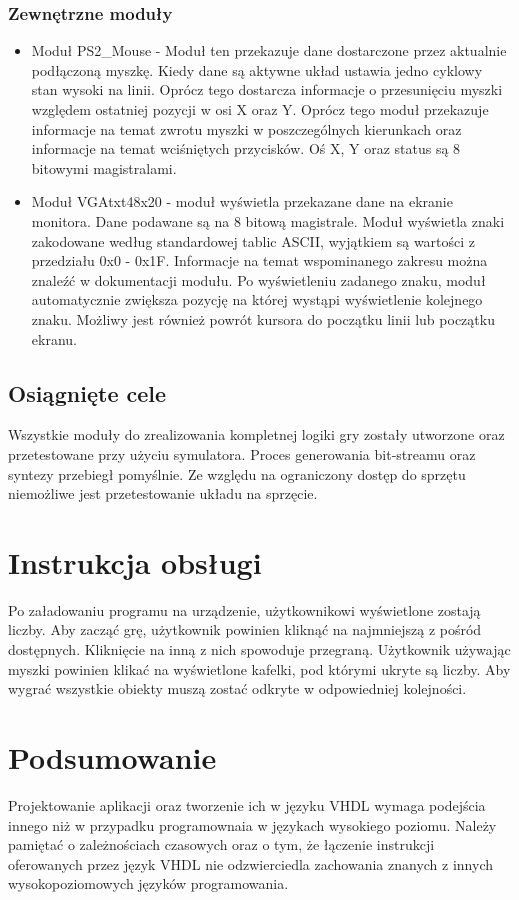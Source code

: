 \documentclass[polish,polish,a4paper]{article}
\begin{document}
\subsubsection{Zewnętrzne moduły}
\begin{itemize}
 \item Moduł PS2\_Mouse - Moduł ten przekazuje dane dostarczone przez aktualnie podłączoną myszkę. Kiedy dane są aktywne układ ustawia jedno cyklowy stan wysoki na linii. Oprócz tego dostarcza informacje o przesunięciu myszki względem ostatniej pozycji w osi X oraz Y. Oprócz tego moduł przekazuje informacje na temat zwrotu myszki w poszczególnych kierunkach oraz informacje na temat wciśniętych przycisków. Oś X, Y oraz status są 8 bitowymi magistralami.
 \item Moduł VGAtxt48x20 - moduł wyświetla przekazane dane na ekranie monitora. Dane podawane są na 8 bitową magistrale. Moduł wyświetla znaki zakodowane według standardowej tablic ASCII, wyjątkiem są wartości z przedziału 0x0 - 0x1F. Informacje na temat wspominanego zakresu można znaleźć w dokumentacji modułu. Po wyświetleniu zadanego znaku, moduł automatycznie zwiększa pozycję na której wystąpi wyświetlenie kolejnego znaku. Możliwy jest również powrót kursora do początku linii lub początku ekranu.
 \end{itemize}

\subsection{Osiągnięte cele}
Wszystkie moduły do zrealizowania kompletnej logiki gry zostały utworzone oraz przetestowane przy użyciu symulatora. Proces generowania bit-streamu oraz syntezy przebiegł pomyślnie. Ze względu na ograniczony dostęp do sprzętu niemożliwe jest przetestowanie układu na sprzęcie.
\section{Instrukcja obsługi}
Po załadowaniu programu na urządzenie, użytkownikowi wyświetlone zostają liczby. Aby zacząć grę, użytkownik powinien kliknąć na najmniejszą z pośród dostępnych. Kliknięcie na inną z nich spowoduje przegraną. Użytkownik używając myszki powinien klikać na wyświetlone kafelki, pod którymi ukryte są liczby. Aby wygrać wszystkie obiekty muszą zostać odkryte w odpowiedniej kolejności.
\section{Podsumowanie}
Projektowanie aplikacji oraz tworzenie ich w języku VHDL wymaga podejścia innego niż w przypadku programownaia w językach wysokiego poziomu. Należy pamiętać o zależnościach czasowych oraz o tym, że łączenie instrukcji oferowanych przez język VHDL nie odzwierciedla zachowania znanych z innych wysokopoziomowych języków programowania.
\end{document}
